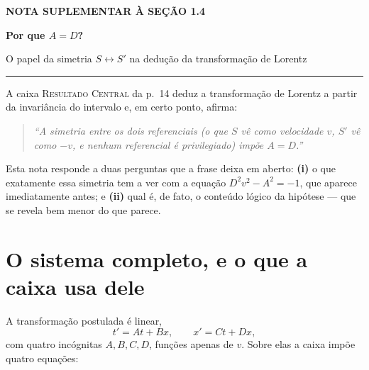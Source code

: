 \documentclass[12pt,a4paper,oneside]{book}
\begin{document}
\thispagestyle{plain}

\noindent
{\sffamily\bfseries\footnotesize\color{rgAmbar}NOTA SUPLEMENTAR À SEÇÃO 1.4}

\vspace{4pt}
\noindent
{\sffamily\bfseries\LARGE\color{rgPetroleo}Por que $A=D$?}

\vspace{2pt}
\noindent
{\sffamily\large\color{rgGrafite}O papel da simetria $S\leftrightarrow S'$
na dedução da transformação de Lorentz}

\vspace{6pt}
\noindent\textcolor{rgLinha}{\rule{\linewidth}{0.8pt}}

\vspace{10pt}

\noindent
A caixa \textsc{Resultado Central} da p.~14 deduz a transformação de Lorentz
a partir da invariância do intervalo e, em certo ponto, afirma:

\begin{quote}\itshape\small\color{rgGrafite}
``A simetria entre os dois referenciais (o que $S$ vê como velocidade $v$,
$S'$ vê como $-v$, e nenhum referencial é privilegiado) impõe $A=D$.''
\end{quote}

\noindent
Esta nota responde a duas perguntas que a frase deixa em aberto:
\textbf{(i)} o que exatamente essa simetria tem a ver com a equação
$D^2v^2-A^2=-1$, que aparece imediatamente antes; e \textbf{(ii)} qual é,
de fato, o conteúdo lógico da hipótese --- que se revela bem menor do que
parece.

\section{O sistema completo, e o que a caixa usa dele}

A transformação postulada é linear,
\begin{equation}
  t' = At + Bx, \qquad x' = Ct + Dx,
  \label{eq:linear}
\end{equation}
com quatro incógnitas $A,B,C,D$, funções apenas de $v$. Sobre elas a caixa
impõe quatro equações:
\end{document}
